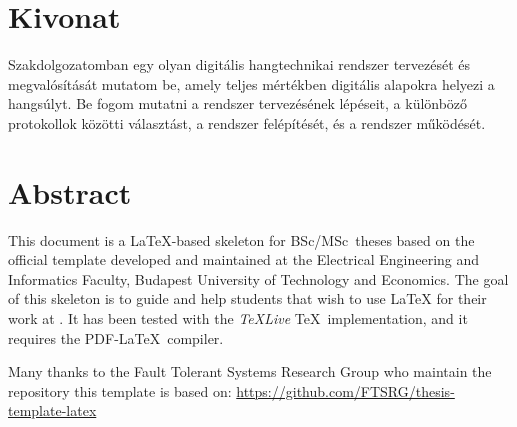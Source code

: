 \setcounter{page}{1}

\selecthungarian

\chapter*{Kivonat}

Szakdolgozatomban egy olyan digitális hangtechnikai rendszer tervezését és megvalósítását mutatom be, amely teljes mértékben digitális alapokra helyezi a hangsúlyt.
Be fogom mutatni a rendszer tervezésének lépéseit, a különböző protokollok közötti választást, a rendszer felépítését, és a rendszer működését.


\vfill
\selectenglish


\chapter*{Abstract}

This document is a \LaTeX-based skeleton for BSc/MSc~theses based on the official template developed and maintained at the Electrical Engineering and Informatics Faculty, Budapest University of Technology and Economics. The goal of this skeleton is to guide and help students that wish to use \LaTeX{} for their work at \sze{} \givk. It has been tested with the \emph{TeXLive} \TeX~implementation, and it requires the PDF-\LaTeX~compiler.

Many thanks to the Fault Tolerant Systems Research Group who maintain the repository this template is based on: \url{https://github.com/FTSRG/thesis-template-latex}


\vfill
\selectthesislanguage

\setcounter{romanPage}{\value{page}}

